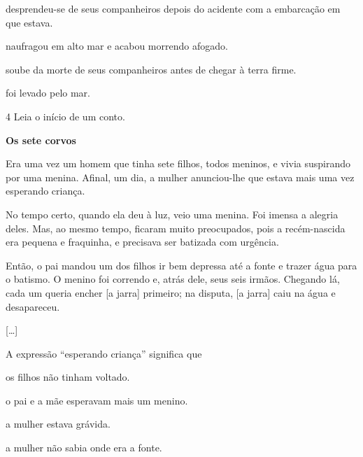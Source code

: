 \begin{escolha}
\item desprendeu-se de seus companheiros depois do acidente com a embarcação em que estava.

\item naufragou em alto mar e acabou morrendo afogado.

\item soube da morte de seus companheiros antes de chegar à terra firme.

\item foi levado pelo mar.
\end{escolha}


\num{4} Leia o início de um conto.

\begin{myquote}
\textbf{Os sete corvos}

Era uma vez um homem que tinha sete filhos, todos meninos, e vivia
suspirando por uma menina. Afinal, um dia, a mulher anunciou-lhe que
estava mais uma vez esperando criança.

No tempo certo, quando ela deu à luz, veio uma menina. Foi imensa a
alegria deles. Mas, ao mesmo tempo, ficaram muito preocupados, pois a
recém-nascida era pequena e fraquinha, e precisava ser batizada com
urgência.

Então, o pai mandou um dos filhos ir bem depressa até a fonte e trazer
água para o batismo. O menino foi correndo e, atrás dele, seus seis
irmãos. Chegando lá, cada um queria encher [a jarra] primeiro; na
disputa, [a jarra] caiu na água e desapareceu.

{[}\ldots{}{]}

\end{myquote}

A expressão ``esperando criança'' significa que

\begin{escolha}
\item os filhos não tinham voltado.

\item o pai e a mãe esperavam mais um menino.

\item a mulher estava grávida.

\item a mulher não sabia onde era a fonte.
\end{escolha}

